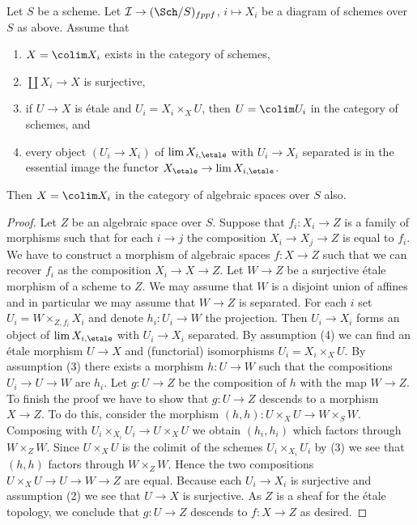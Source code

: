 \begin{lemma}
\label{lemma-colimit-agrees}
Let $S$ be a scheme. Let $\mathcal{I} \to (\Sch/S)_{fppf}$, $i \mapsto X_i$
be a diagram of schemes over $S$ as above. Assume that
\begin{enumerate}
\item $X = \colim X_i$ exists in the category of schemes,
\item $\coprod X_i \to X$ is surjective,
\item if $U \to X$ is \'etale and $U_i = X_i \times_X U$, then
$U = \colim U_i$ in the category of schemes, and
\item every object $(U_i \to X_i)$ of $\lim X_{i, \etale}$
with $U_i \to X_i$ separated is in the essential image
the functor $X_\etale \to \lim X_{i, \etale}$.
\end{enumerate}
Then $X = \colim X_i$ in the category of algebraic spaces over $S$ also.
\end{lemma}

\begin{proof}
Let $Z$ be an algebraic space over $S$. Suppose that $f_i : X_i \to Z$ is
a family of morphisms such that for each $i \to j$ the composition
$X_i \to X_j \to Z$ is equal to $f_i$. We have to construct a morphism
of algebraic spaces $f : X \to Z$ such that we can recover $f_i$ as
the composition $X_i \to X \to Z$. Let $W \to Z$ be a surjective
\'etale morphism of a scheme to $Z$. We may assume that $W$ is a
disjoint union of affines and in particular we may assume that
$W \to Z$ is separated. For each $i$ set
$U_i = W \times_{Z, f_i} X_i$ and denote $h_i : U_i \to W$ the projection.
Then $U_i \to X_i$ forms an object of $\lim X_{i, \etale}$
with $U_i \to X_i$ separated. By
assumption (4) we can find an \'etale morphism $U \to X$ and (functorial)
isomorphisms $U_i = X_i \times_X U$. By assumption (3) there exists a morphism
$h : U \to W$ such that the compositions $U_i \to U \to W$ are $h_i$.
Let $g : U \to Z$ be the composition of $h$ with the map $W \to Z$. To
finish the proof we have to show that $g : U \to Z$ descends to a morphism
$X \to Z$. To do this, consider the morphism
$(h, h) : U \times_X U \to W \times_S W$.
Composing with $U_i \times_{X_i} U_i \to U \times_X U$ we obtain
$(h_i, h_i)$ which factors through $W \times_Z W$. Since $U \times_X U$
is the colimit of the schemes $U_i \times_{X_i} U_i$ by (3) we see
that $(h, h)$ factors through $W \times_Z W$. Hence the two compositions
$U \times_X U \to U \to W \to Z$ are equal. Because each $U_i \to X_i$ is
surjective and assumption (2) we see that $U \to X$ is surjective.
As $Z$ is a sheaf for the \'etale topology, we conclude that
$g : U \to Z$ descends to $f : X \to Z$ as desired.
\end{proof}

